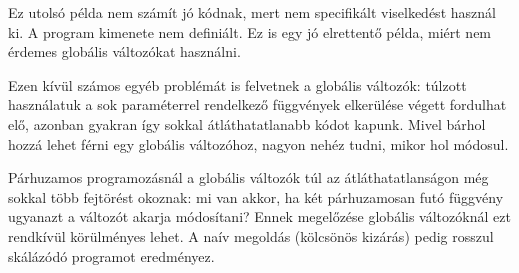 \documentclass[../cpp_book/cpp_book.tex]{subfiles}
\begin{document}
	\begin{note}
		Ez utolsó példa nem számít jó kódnak, mert nem specifikált viselkedést használ ki. A program kimenete nem definiált. Ez is egy jó elrettentő példa, miért nem érdemes globális változókat használni.
	\end{note}
	
	Ezen kívül számos egyéb problémát is felvetnek a globális változók: túlzott használatuk a sok paraméterrel rendelkező függvények elkerülése végett fordulhat elő, azonban gyakran így sokkal átláthatatlanabb kódot kapunk. Mivel bárhol hozzá lehet férni egy globális változóhoz, nagyon nehéz tudni, mikor hol módosul.
	\begin{note}
    Párhuzamos programozásnál a globális változók túl az átláthatatlanságon még sokkal több fejtörést okoznak: mi van akkor, ha két párhuzamosan futó függvény ugyanazt a változót akarja módosítani? Ennek megelőzése globális változóknál ezt rendkívül körülményes lehet. A naív megoldás (kölcsönös kizárás) pedig rosszul skálázódó programot eredményez.
	\end{note}
\end{document}
